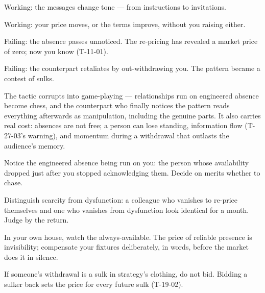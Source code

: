 \begin{feedback}
  \item Working: the messages change tone --- from instructions to invitations.
  \item Working: your price moves, or the terms improve, without you raising either.
  \item Failing: the absence passes unnoticed. The re-pricing has revealed a market price of zero; now you know (T-11-01).
  \item Failing: the counterpart retaliates by out-withdrawing you. The pattern became a contest of sulks.
\end{feedback}
\begin{failure}
The tactic corrupts into game-playing --- relationships run on engineered absence become chess, and the counterpart who finally notices the pattern reads everything afterwards as manipulation, including the genuine parts. It also carries real cost: absences are not free; a person can lose standing, information flow (T-27-03's warning), and momentum during a withdrawal that outlasts the audience's memory.
\end{failure}
\begin{countermeasures}
  \item Notice the engineered absence being run on you: the person whose availability dropped just after you stopped acknowledging them. Decide on merits whether to chase.
  \item Distinguish scarcity from dysfunction: a colleague who vanishes to re-price themselves and one who vanishes from dysfunction look identical for a month. Judge by the return.
  \item In your own house, watch the always-available. The price of reliable presence is invisibility; compensate your fixtures deliberately, in words, before the market does it in silence.
  \item If someone's withdrawal is a sulk in strategy's clothing, do not bid. Bidding a sulker back sets the price for every future sulk (T-19-02).
\end{countermeasures}

\seesources
{}
